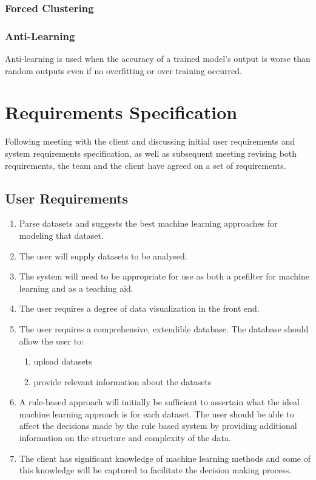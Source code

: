 \documentclass[titlepage]{article}
\begin{document}
\subsubsection*{Forced Clustering}
\subsubsection*{Anti-Learning}
Anti-learning is used when the accuracy of a trained model's output is worse than random outputs even if no overfitting or over training occurred.

\section{Requirements Specification}
Following meeting with the client and discussing initial user requirements and system requirements specification, as well as subsequent meeting revising both requirements, the team and the client have agreed on a set of requirements.

\subsection{User Requirements}

\begin{enumerate}
  \item Parse datasets and suggests the best machine learning approaches for modeling that dataset.

  \item The user will supply datasets to be analysed.
  
  \item The system will need to be appropriate for use as both a prefilter for machine learning and as a teaching aid.
  
  \item The user requires a degree of data visualization in the front end.
  
  \item The user requires a comprehensive, extendible database. The database should allow the user to:
  \begin{enumerate}
    \item upload datasets
    \item provide relevant information about the datasets
  \end{enumerate}
  
  \item A rule-based approach will initially be sufficient to assertain what the ideal machine learning approach is for each dataset. The user should be able to affect the decisions made by the rule based system by providing additional information on the structure and complexity of the data.
  
  \item The client has significant knowledge of machine learning methods and some of this knowledge will be captured to facilitate the decision making process.
\end{enumerate}
\end{document}
